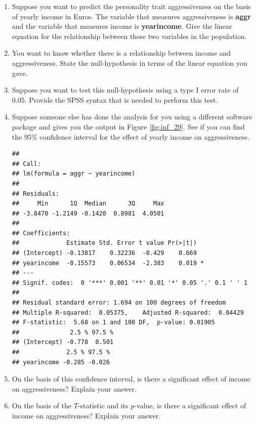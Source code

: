 \documentclass[]{report}\usepackage[]{graphicx}\usepackage[]{color}
\makeatletter
\newenvironment{kframe}{%
 \def\at@end@of@kframe{}%
 \ifinner\ifhmode%
  \def\at@end@of@kframe{\end{minipage}}%
  \begin{minipage}{\columnwidth}%
 \fi\fi%
 \def\FrameCommand##1{\hskip\@totalleftmargin \hskip-\fboxsep
 \colorbox{shadecolor}{##1}\hskip-\fboxsep
     \hskip-\linewidth \hskip-\@totalleftmargin \hskip\columnwidth}%
 \MakeFramed {\advance\hsize-\width
   \@totalleftmargin\z@ \linewidth\hsize
   \@setminipage}}%
 {\par\unskip\endMakeFramed%
 \at@end@of@kframe}
\newenvironment{knitrout}{}{} %
\makeatother
\begin{document}
\begin{enumerate}
\item Suppose you want to predict the personality trait aggressiveness on the basis of yearly income in Euros. The variable that measures aggressiveness is \textbf{aggr} and the variable that measures income is \textbf{yearincome}. Give the linear equation for the relationship between these two variables in the population.

\item You want to know whether there is a relationship between income and aggressiveness. State the null-hypothesis in terms of the linear equation you gave.

\item Suppose you want to test this null-hypothesis using a type I error rate of 0.05. Provide the SPSS syntax that is needed to perform this test.

\item Suppose someone else has done the analysis for you using a different software package and gives you the output in Figure \ref{fig:inf_29}. See if you can find the 95\% confidence interval for the effect of yearly income on aggressiveness.

\begin{knitrout}
\color{fgcolor}\begin{kframe}
\begin{verbatim}
## 
## Call:
## lm(formula = aggr ~ yearincome)
## 
## Residuals:
##     Min      1Q  Median      3Q     Max 
## -3.8470 -1.2149 -0.1420  0.8981  4.0501 
## 
## Coefficients:
##             Estimate Std. Error t value Pr(>|t|)  
## (Intercept) -0.13817    0.32236  -0.429    0.669  
## yearincome  -0.15573    0.06534  -2.383    0.019 *
## ---
## Signif. codes:  0 '***' 0.001 '**' 0.01 '*' 0.05 '.' 0.1 ' ' 1
## 
## Residual standard error: 1.694 on 100 degrees of freedom
## Multiple R-squared:  0.05375,	Adjusted R-squared:  0.04429 
## F-statistic:  5.68 on 1 and 100 DF,  p-value: 0.01905
##              2.5 % 97.5 %
## (Intercept) -0.778  0.501
##             2.5 % 97.5 %
## yearincome -0.285 -0.026
\end{verbatim}
\end{kframe}
\end{knitrout}


\item On the basis of this confidence interval, is there a significant effect of income on aggressiveness? Explain your answer.

\item On the basis of the $T$-statistic and its $p$-value, is there a significant effect of income on aggressiveness? Explain your answer.


\end{enumerate}
\end{document}

